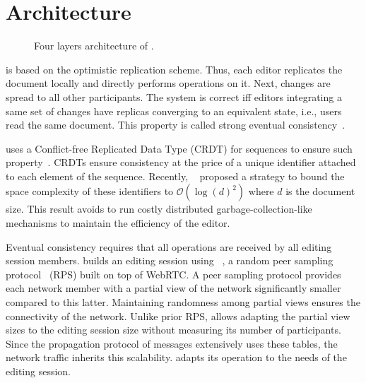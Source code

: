 
\section{Architecture}
\label{sec:architecture}

\begin{figure}
  \centering
  
  \caption{\label{fig:architecture} Four layers architecture of \CRATE.}
\end{figure}

\CRATE is based on the optimistic replication scheme. Thus, each editor
replicates the document locally and directly performs operations on it. Next,
changes are spread to all other participants. The system is correct iff editors
integrating a same set of changes have replicas converging to an equivalent
state, i.e., users read the same document.  This property is called strong
eventual consistency~\cite{shapiro2011comprehensive}.

\CRATE uses a Conflict-free Replicated Data Type (CRDT) for sequences to ensure
such property~\cite{shapiro2011comprehensive}. CRDTs ensure consistency at the
price of a unique identifier attached to each element of the sequence. Recently,
\LSEQ~\cite{nedelec2013lseq} proposed a strategy to bound the space complexity
of these identifiers to $\mathcal{O}(\log(d)^2)$ where $d$ is the document
size. This result avoids to run costly distributed garbage-collection-like
mechanisms to maintain the efficiency of the editor.

Eventual consistency requires that all operations are received by all editing
session members.  \CRATE builds an editing session using
\SPRAY~\cite{nedelec2015spray}, a random peer sampling
protocol~\cite{jelasity2007gossip} (RPS) built on top of WebRTC. A peer sampling
protocol provides each network member with a partial view of the network
significantly smaller compared to this latter. Maintaining randomness among
partial views ensures the connectivity of the network. Unlike prior RPS, \SPRAY
allows adapting the partial view sizes to the editing session size without
measuring its number of participants. Since the propagation protocol of messages
extensively uses these tables, the network traffic inherits this scalability.
\CRATE adapts its operation to the needs of the editing session.

